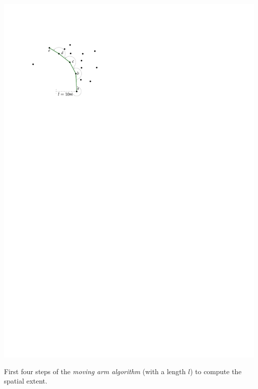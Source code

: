 \begin{marginfigure}
  \centering
  \includegraphics[page=1,width=\textwidth]{figs/movingarm.pdf}
  \caption{First four steps of the \emph{moving arm algorithm} (with a length $l$) to compute the spatial extent.}%
\end{marginfigure}


